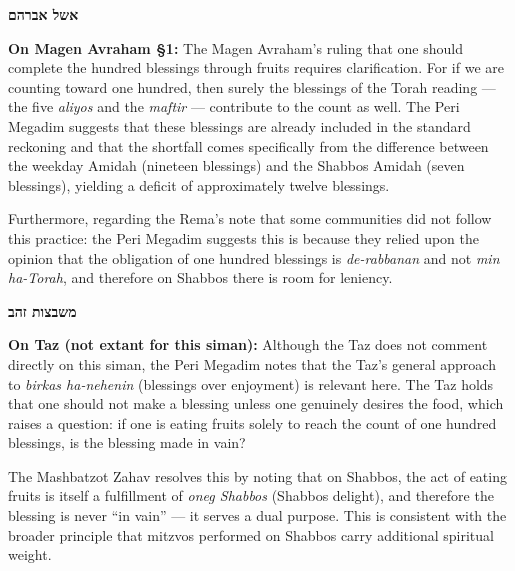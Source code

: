 \documentclass[11pt,letterpaper,openany]{scrbook}
\begin{document}
\begin{sloppypar}
\vspace{2pt}

\noindent
\begin{minipage}[t]{0.49\textwidth}
\begin{eshelbox}
{\commentaryfont\fontsize{9}{11}\selectfont\textcolor{hcolor}{\textbf{\texthebrew{אשל אברהם}}}}\par\smallskip
\textbf{On Magen Avraham \S1:}
The Magen Avraham's ruling that one should complete the hundred blessings through fruits requires clarification. For if we are counting toward one hundred, then surely the blessings of the Torah reading --- the five \textit{aliyos} and the \textit{maftir} --- contribute to the count as well. The Peri Megadim suggests that these blessings are already included in the standard reckoning and that the shortfall comes specifically from the difference between the weekday Amidah (nineteen blessings) and the Shabbos Amidah (seven blessings), yielding a deficit of approximately twelve blessings.

Furthermore, regarding the Rema's note that some communities did not follow this practice: the Peri Megadim suggests this is because they relied upon the opinion that the obligation of one hundred blessings is \textit{de-rabbanan} and not \textit{min ha-Torah}, and therefore on Shabbos there is room for leniency.
\end{eshelbox}
\end{minipage}%
\hfill
\begin{minipage}[t]{0.49\textwidth}
\begin{mashbatzotbox}
{\commentaryfont\fontsize{9}{11}\selectfont\textcolor{hcolor}{\textbf{\texthebrew{משבצות זהב}}}}\par\smallskip
\textbf{On Taz (not extant for this siman):}
Although the Taz does not comment directly on this siman, the Peri Megadim notes that the Taz's general approach to \textit{birkas ha-nehenin} (blessings over enjoyment) is relevant here. The Taz holds that one should not make a blessing unless one genuinely desires the food, which raises a question: if one is eating fruits solely to reach the count of one hundred blessings, is the blessing made in vain?

The Mashbatzot Zahav resolves this by noting that on Shabbos, the act of eating fruits is itself a fulfillment of \textit{oneg Shabbos} (Shabbos delight), and therefore the blessing is never ``in vain'' --- it serves a dual purpose. This is consistent with the broader principle that mitzvos performed on Shabbos carry additional spiritual weight.


\end{mashbatzotbox}
\end{minipage}
\end{sloppypar}
\end{document}
